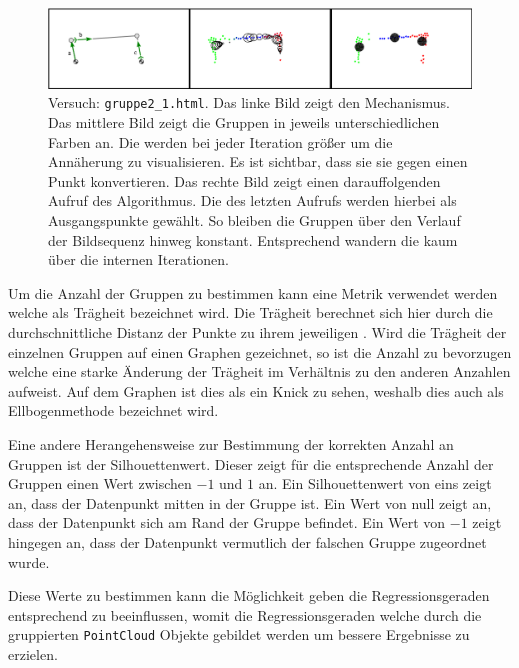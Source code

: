 \begin{figure}
    \centering
    \includegraphics[width=\textwidth]{gfx/k_means_centroids_edit.png}
    \caption{Versuch: \lstinline{gruppe2_1.html}. Das linke Bild zeigt den Mechanismus. Das mittlere Bild zeigt die Gruppen in jeweils unterschiedlichen Farben an. Die  werden bei jeder Iteration größer um die Annäherung zu visualisieren. Es ist sichtbar, dass sie sie gegen einen Punkt konvertieren. Das rechte Bild zeigt einen darauffolgenden Aufruf des Algorithmus. Die  des letzten Aufrufs werden hierbei als Ausgangspunkte gewählt. So bleiben die Gruppen über den Verlauf der Bildsequenz hinweg konstant. Entsprechend wandern die  kaum über die internen Iterationen.}
    \label{fig:gruppe2_1}
\end{figure}

Um die Anzahl der Gruppen zu bestimmen kann eine Metrik verwendet werden welche als Trägheit bezeichnet wird.
Die Trägheit berechnet sich hier durch die durchschnittliche Distanz der Punkte zu ihrem jeweiligen .
Wird die Trägheit der einzelnen Gruppen auf einen Graphen gezeichnet, so ist die Anzahl zu bevorzugen welche eine starke Änderung der Trägheit im Verhältnis zu den anderen Anzahlen aufweist.
Auf dem Graphen ist dies als ein Knick zu sehen, weshalb dies auch als Ellbogenmethode bezeichnet wird.

Eine andere Herangehensweise zur Bestimmung der korrekten Anzahl an Gruppen ist der Silhouettenwert.
Dieser zeigt für die entsprechende Anzahl der Gruppen einen Wert zwischen $-1$ und $1$ an.
Ein Silhouettenwert von eins zeigt an, dass der Datenpunkt mitten in der Gruppe ist.
Ein Wert von null zeigt an, dass der Datenpunkt sich am Rand der Gruppe befindet.
Ein Wert von $-1$ zeigt hingegen an, dass der Datenpunkt vermutlich der falschen Gruppe zugeordnet wurde.


Diese Werte zu bestimmen kann die Möglichkeit geben die Regressionsgeraden entsprechend zu beeinflussen, womit die Regressionsgeraden welche durch die gruppierten \lstinline{PointCloud} Objekte gebildet werden um bessere Ergebnisse zu erzielen.

